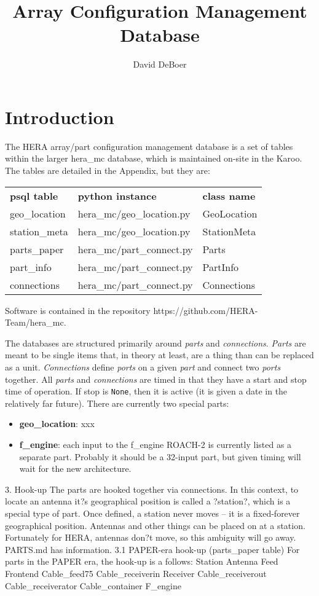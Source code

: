 \documentclass{article}
\begin{document}
\author{David DeBoer}
\title{Array Configuration Management Database}
\maketitle

\section{Introduction}
The HERA array/part configuration management database is a set of tables within the larger hera\_mc database, which is maintained on-site in the Karoo.  The tables are detailed in the Appendix, 
but they are:  
\begin{tabular}{l l l}
         {\bf psql table} & {\bf python instance}  &  {\bf class name} \\
	geo\_location 	& hera\_mc/geo\_location.py & GeoLocation \\
	station\_meta 	& hera\_mc/geo\_location.py & StationMeta \\
	parts\_paper 	& hera\_mc/part\_connect.py & Parts \\
	part\_info 	         & hera\_mc/part\_connect.py & PartInfo \\
	connections 	& hera\_mc/part\_connect.py & Connections \\
\end{tabular}

Software is contained in the repository https://github.com/HERA-Team/hera\_mc.

The databases are structured primarily around {\em parts} and {\em connections}.  {\em Parts} are meant to be single items that, in theory at least, are a thing than can be replaced as a unit.  
{\em Connections} define {\em ports} on a given {\em part} and connect two {\em ports} together.  All {\em parts} and {\em connections} are timed in that they have a start and stop time of operation.  If stop is {\tt None}, then it is active (it is given a date in the relatively far future).  There are currently two special parts:  
\begin{itemize}
	\item {\bf geo\_location}: xxx  
	\item {\bf f\_engine}:  each input to the f\_engine ROACH-2 is currently listed as a separate part.  Probably it should be a 32-input part, but given timing will wait for the new architecture.
\end{itemize}

3. Hook-up
The parts are hooked together via connections.  In this context, to locate an antenna it?s geographical position is called a ?station?, which is a special type of part.  Once defined, a station never moves -- it is a fixed-forever geographical position.  Antennas and other things can be placed on at a station.  Fortunately for HERA, antennas don?t move, so this ambiguity will go away.  PARTS.md has information.
3.1 PAPER-era hook-up (parts\_paper table)
For parts in the PAPER era, the hook-up is a follows:
Station
Antenna
Feed
Frontend
Cable\_feed75
Cable\_receiverin
Receiver
Cable\_receiverout
Cable\_receiverator
Cable\_container
F\_engine
\end{document}
